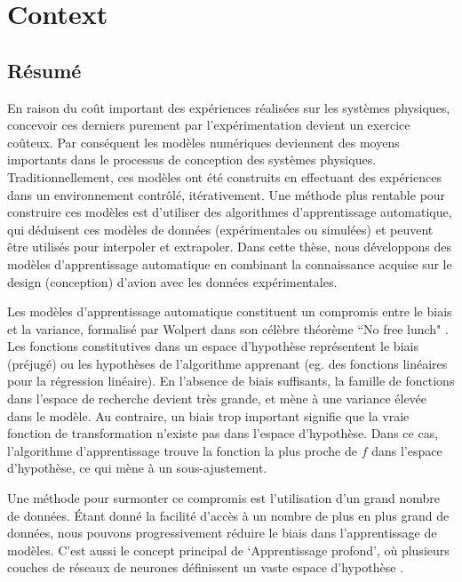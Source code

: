 \chapter{Context}
\label{chapIntroduction}

\begin{mdframed}[hidealllines=true,backgroundcolor=lightgray!20]
\section*{Résumé}
En raison du coût important des expériences réalisées sur les systèmes physiques, concevoir ces derniers purement par l'expérimentation devient un exercice coûteux. Par conséquent les modèles numériques deviennent des moyens importants dans le processus de conception des systèmes physiques. Traditionnellement, ces modèles ont été construits en effectuant des expériences dans un environnement contrôlé, itérativement. Une méthode plus rentable pour construire ces modèles est  d'utiliser des algorithmes d'apprentissage automatique, qui déduisent ces modèles de données (expérimentales ou simulées) et peuvent être utilisés pour interpoler et extrapoler. Dans cette thèse, nous développons des modèles d'apprentissage automatique en combinant la connaissance acquise sur le design (conception) d'avion avec les données expérimentales.

Les modèles d'apprentissage automatique constituent un compromis entre le biais et la variance, formalisé par Wolpert dans son célèbre théorème ``No free lunch" \cite{wolpert1997no}. Les fonctions constitutives dans un espace d'hypothèse représentent le biais (préjugé) ou les hypothèses de l'algorithme apprenant (eg. des fonctions linéaires pour la régression linéaire). En l'absence de biais suffisants, la famille de fonctions dans l'espace de recherche devient très grande, et mène à une variance élevée dans le modèle. Au contraire, un biais trop important signifie que la vraie fonction de transformation n'existe pas dans l'espace d'hypothèse. Dans ce cas, l'algorithme d'apprentissage trouve la fonction la plus proche de $f$ dans l'espace d'hypothèse, ce qui mène à un sous-ajustement.

Une méthode pour surmonter ce compromis est l'utilisation d'un grand nombre de données. Étant donné la facilité d'accès à un nombre de plus en plus grand de données, nous pouvons progressivement réduire le biais dans l'apprentissage de modèles. C'est aussi le concept principal de `Apprentissage profond', où plusieurs couches de réseaux de neurones définissent un vaste espace d'hypothèse  \cite{Goodfellow-et-al-2016, lecun2015deep}.


\end{mdframed}
